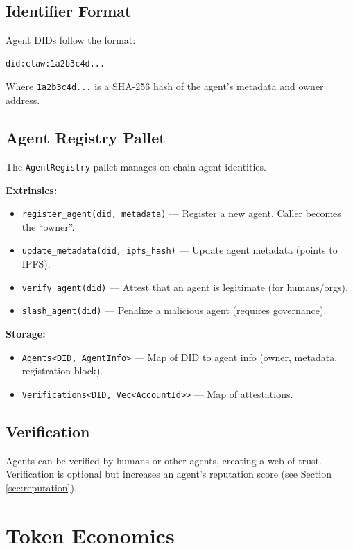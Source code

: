 \documentclass{article}
\begin{document}
\subsection{Identifier Format}

Agent DIDs follow the format:
\begin{verbatim}
did:claw:1a2b3c4d...
\end{verbatim}

Where \texttt{1a2b3c4d...} is a SHA-256 hash of the agent's metadata and owner address.

\subsection{Agent Registry Pallet}

The \texttt{AgentRegistry} pallet manages on-chain agent identities.

\textbf{Extrinsics:}
\begin{itemize}
    \item \texttt{register_agent(did, metadata)} — Register a new agent. Caller becomes the ``owner''.
    \item \texttt{update_metadata(did, ipfs_hash)} — Update agent metadata (points to IPFS).
    \item \texttt{verify_agent(did)} — Attest that an agent is legitimate (for humans/orgs).
    \item \texttt{slash_agent(did)} — Penalize a malicious agent (requires governance).
\end{itemize}

\textbf{Storage:}
\begin{itemize}
    \item \texttt{Agents<DID, AgentInfo>} — Map of DID to agent info (owner, metadata, registration block).
    \item \texttt{Verifications<DID, Vec<AccountId>>} — Map of attestations.
\end{itemize}

\subsection{Verification}

Agents can be verified by humans or other agents, creating a web of trust. Verification is optional but increases an agent's reputation score (see Section \ref{sec:reputation}).

\section{Token Economics}\label{sec:token}
\end{document}
